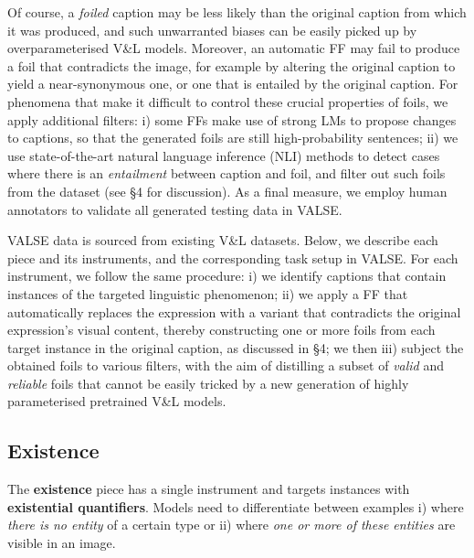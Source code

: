 \documentclass[11pt]{article}
\newcommand{\dataset}{VALSE}
\begin{document}
Of course, a \textit{foiled} caption may be
less likely than the original caption from which it was produced, and such
unwarranted biases 
can be easily picked up
by overparameterised V\&L models.
Moreover, an automatic FF
may fail to produce a foil that contradicts the image, for example by altering the original caption to yield a near-synonymous one, or one that is entailed by the original caption.
For phenomena that make it difficult to control these crucial properties of foils, we apply additional filters:
i) some FFs make use of strong LMs to propose changes to captions, so that the generated foils are still high-probability sentences; ii) we use state-of-the-art natural language inference (NLI) methods
to detect cases where there is an \emph{entailment} between caption and foil, and filter out such foils from the dataset (see \S 4 for discussion).
As a final measure, we employ human annotators to validate all generated testing data in \dataset{}.


\dataset{} data is sourced from
existing V\&L datasets.
Below, we describe each piece and its instruments, and the corresponding task setup in \dataset{}.  For each instrument, we follow the same procedure:
i) we identify captions that contain instances of the targeted linguistic phenomenon;
ii) we apply a FF that automatically replaces the expression with a variant that contradicts the original expression's visual content, thereby constructing one or more foils from each target instance in the original caption, as discussed in \S 4; we then
iii) subject the obtained foils to various filters, with the aim of distilling a subset of \textit{valid} and \textit{reliable} foils that cannot be easily tricked by a new generation of highly parameterised pretrained V\&L models.





\subsection{Existence}\label{subsec:existence}
The {\bf existence} piece has a single instrument and targets instances with \textbf{existential quantifiers}.
Models need to differentiate between examples i) where \textit{there is no entity} of a certain type or ii) where \textit{one or more of these entities} are visible in an image.
\end{document}

